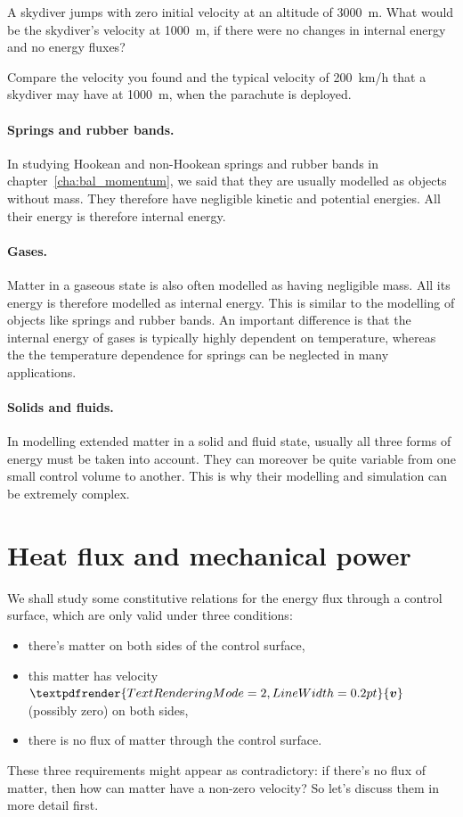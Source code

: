 \documentclass[a4paper,12pt,%
onecolumn,oneside,%
british%
]{memoir}
\renewcommand*{\bm}[1]{\textpdfrender{TextRenderingMode=2,LineWidth=0.2pt}{\boldsymbol{#1}}}
\renewcommand*{\|}[1][]{\nonscript\:#1\vert\nonscript\:\mathopen{}}
\newcommand*{\chap}{chapter}%
\newcommand*{\yv}{\bm{v}}
\begin{document}
\begin{exercise}
  A skydiver jumps with zero initial velocity at an altitude of \qty{3000}{m}. What would be the skydiver's velocity at \qty{1000}{m}, if there were no changes in internal energy and no energy fluxes?

  \smallskip

  Compare the velocity you found and the typical velocity of \qty{200}{km/h} that a skydiver may have at \qty{1000}{m}, when the parachute is deployed.
\end{exercise}

\paragraph{Springs and rubber bands.}

In studying Hookean and non-Hookean springs and rubber bands in \chap~\ref{cha:bal_momentum}, we said that they are usually modelled as objects without mass. They therefore have negligible kinetic and potential energies. All their energy is therefore internal energy.

\paragraph{Gases.}
Matter in a gaseous state is also often modelled as having negligible mass. All its energy is therefore modelled as internal energy. This is similar to the modelling of objects like springs and rubber bands. An important difference is that the internal energy of gases is typically highly dependent on temperature, whereas the the temperature dependence for springs can be neglected in many applications.

\paragraph{Solids and fluids.}

In modelling extended matter in a solid and fluid state, usually all three forms of energy must be taken into account. They can moreover be quite variable from one small control volume to another. This is why their modelling and simulation can be extremely complex.

\section{Heat flux and mechanical power}
\label{sec:heating_power}

We shall study some constitutive relations for the energy flux through a control surface, which are only valid under three conditions:
\begin{itemize}[noitemsep]
\item there's matter on both sides of the control surface,
\item this matter has velocity $\yv$ (possibly zero) on both sides,
\item there is no flux of matter through the control surface.
\end{itemize}
These three requirements might appear as contradictory: if there's no flux of matter, then how can matter have a non-zero velocity? So let's discuss them in more detail first.
\end{document}
